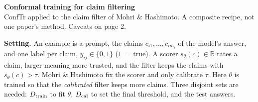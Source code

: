 \documentclass[10pt,a4paper]{article}
\newcommand{\Dtr}{D_{\rm train}}
\newcommand{\Dcal}{D_{\rm cal}}
\begin{document}
{\Large\bfseries\color{secblue} Conformal training for claim filtering}\\[1pt]
{\small\textcolor{ourfr}{ConfTr applied to the claim filter of Mohri \& Hashimoto. A composite recipe, not one paper's method. Caveats on page 2.}}

\vspace{2pt}
\textbf{Setting.} An example is a prompt, the claims $c_{i1},\dots,c_{im_i}$ of the model's answer, and one label per claim, $y_{ij}\in\{0,1\}$ ($1=$ true). A scorer $s_\theta(c)\in\mathbb{R}$ rates a claim, larger meaning more trusted, and the filter keeps the claims with $s_\theta(c)>\tau$. Mohri \& Hashimoto fix the scorer and only calibrate $\tau$. Here $\theta$ is trained so that the \emph{calibrated} filter keeps more claims. Three disjoint sets are needed: $\Dtr$ to fit $\theta$, $\Dcal$ to set the final threshold, and the test answers.
\end{document}
